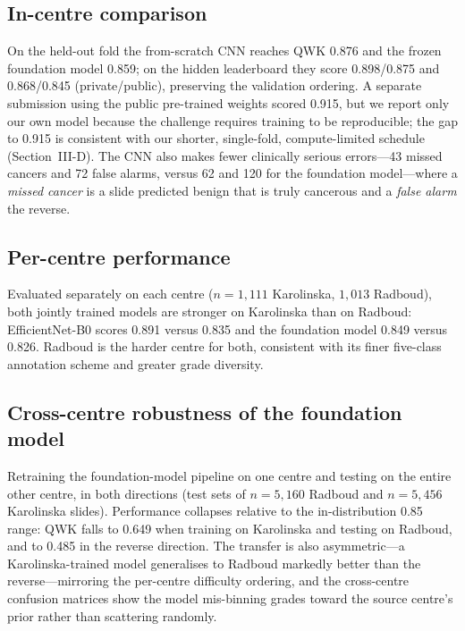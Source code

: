 \documentclass[conference]{IEEEtran}
\begin{document}
\subsection{In-centre comparison}
On the held-out fold the from-scratch CNN reaches QWK 0.876 and the frozen
foundation model 0.859; on the hidden leaderboard they score 0.898/0.875 and
0.868/0.845 (private/public), preserving the validation ordering. A separate
submission using the public pre-trained weights scored 0.915, but we report only
our own model because the challenge requires training to be reproducible; the gap
to 0.915 is consistent with our shorter, single-fold, compute-limited schedule
(Section~III-D). The CNN also makes fewer clinically serious errors---43 missed
cancers and 72 false alarms, versus 62 and 120 for the foundation model---where a
\emph{missed cancer} is a slide predicted benign that is truly cancerous and a
\emph{false alarm} the reverse.

\subsection{Per-centre performance}
Evaluated separately on each centre ($n{=}1{,}111$ Karolinska, $1{,}013$ Radboud),
both jointly trained models are stronger on Karolinska than on Radboud:
EfficientNet-B0 scores 0.891 versus 0.835 and the foundation model 0.849 versus
0.826. Radboud is the harder centre for both, consistent with its finer five-class
annotation scheme and greater grade diversity.

\subsection{Cross-centre robustness of the foundation model}
Retraining the foundation-model pipeline on one centre and testing on the entire
other centre, in both directions (test sets of $n{=}5{,}160$ Radboud and
$n{=}5{,}456$ Karolinska slides). Performance collapses relative to the
in-distribution 0.85 range: QWK falls to 0.649 when training on Karolinska and
testing on Radboud, and to 0.485 in the reverse direction. The transfer is also
asymmetric---a Karolinska-trained model generalises to Radboud markedly better than
the reverse---mirroring the per-centre difficulty ordering, and the cross-centre
confusion matrices show the model mis-binning grades toward the source centre's
prior rather than scattering randomly.
\end{document}
